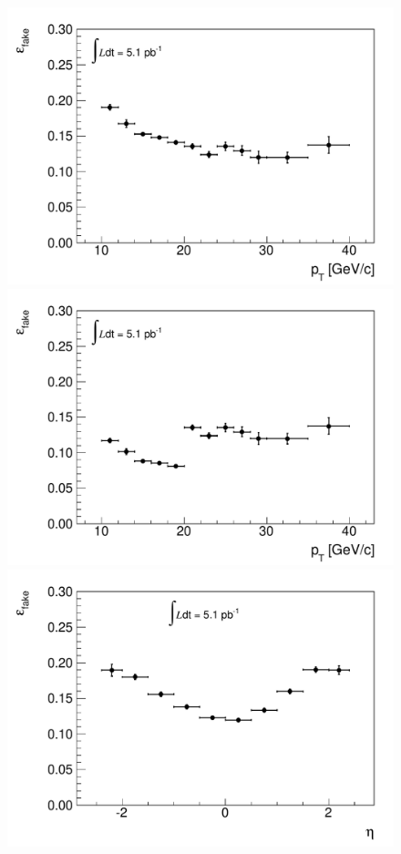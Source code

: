 \begin{figure}[!htbp]
\begin{center}
\includegraphics[scale=0.33]{figures/frpt_old.pdf}
\includegraphics[scale=0.33]{figures/frpt_new.pdf} \\
\includegraphics[scale=0.33]{figures/freta_old.pdf}

\end{center}
\end{figure}
